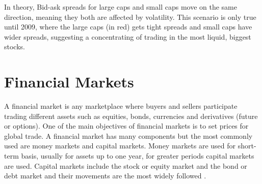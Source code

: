 In theory, Bid-ask spreads for large caps and small caps move on the same direction, meaning they both are affected by volatility. This scenario is only true until 2009, where the large caps (in red) gets tight spreads and small caps have wider  spreads, suggesting a concentrating of trading in the most liquid, biggest stocks. 

\section{Financial Markets}

A financial market is any marketplace where buyers and sellers participate
trading different assets such as equities, bonds, currencies and derivatives
(future or options). One of the main objectives of financial markets is to set
prices for global trade.
A financial market has many components but the most commonly used are money
markets and capital markets. Money markets are used for short-term basis,
usually for assets up to one year, for greater periods capital markets are used.
Capital markets include the stock or equity market and the bond or debt market
and their movements are the most widely followed \cite{aldridge2009}.

